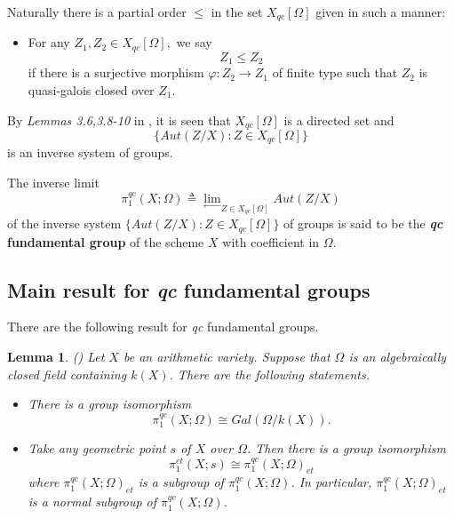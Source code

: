 \documentclass[12pt,twoside,reqno]{amsart}
\newtheorem{lemma}[theorem]{Lemma}
\theoremstyle{definition}
\numberwithin{equation}{section}
\begin{document}
Naturally there is a partial order $\leq$ in the set $X_{qc}\left[ \Omega \right] $ given in such
a manner:
\begin{itemize}
\item For any $Z_{1},Z_{2}\in X_{qc}\left[ \Omega \right] ,$ we say
\begin{equation*}
Z_{1}\leq Z_{2}
\end{equation*}
if there is a surjective morphism $\varphi :Z_{2}\rightarrow Z_{1}$ of
finite type such that $Z_{2}$ is quasi-galois closed over $Z_{1}.$
\end{itemize}

By \emph{Lemmas 3.6,3.8-10} in \cite{An5}, it is seen that $X_{qc}\left[ \Omega
\right] $ is a directed set and
\begin{equation*}
\{Aut\left( Z/X\right) :Z\in X_{qc}\left[ \Omega \right] \}
\end{equation*}
is an inverse system of groups.

The
inverse limit
\begin{equation*}
\pi _{1}^{qc}\left( X;\Omega \right) \triangleq {\lim_{\longleftarrow}}
_{Z\in X_{qc}\left[ \Omega \right] }{Aut\left( Z/X\right)}
\end{equation*}
of the inverse system $\{Aut\left( Z/X\right) :Z\in X_{qc}\left[ \Omega
\right] \}$ of groups is said to be the \textbf{\emph{qc} fundamental group} of the
scheme $X$ with coefficient in $\Omega .$


\subsection{Main result for \emph{qc} fundamental groups}

There are the following result for \emph{qc} fundamental groups.

\begin{lemma}
\emph{(\cite{An5})}
Let $X$ be an arithmetic variety. Suppose that  $\Omega$ is an algebraically closed field containing  $k\left( X\right) $.
There are the
following statements.
\begin{itemize}
\item There is a group isomorphism
\begin{equation*}
\pi _{1}^{qc}\left( X;\Omega \right) \cong Gal\left( {\Omega }/k\left(
X\right) \right) .
\end{equation*}

\item Take any geometric point $s$ of $X$ over $\Omega $. Then
there is a group isomorphism
\begin{equation*}
\pi _{1}^{et}\left( X;s\right) \cong \pi _{1}^{qc}\left( X;\Omega \right)
_{et}
\end{equation*}
where $\pi _{1}^{qc}\left( X;\Omega \right) _{et}$ is a subgroup of $\pi
_{1}^{qc}\left( X;\Omega \right) $. In particular, $\pi _{1}^{qc}\left( X;\Omega
\right) _{et}$ is a normal subgroup of $\pi _{1}^{qc}\left( X;\Omega \right)
$.
\end{itemize}
\end{lemma}
\end{document}
